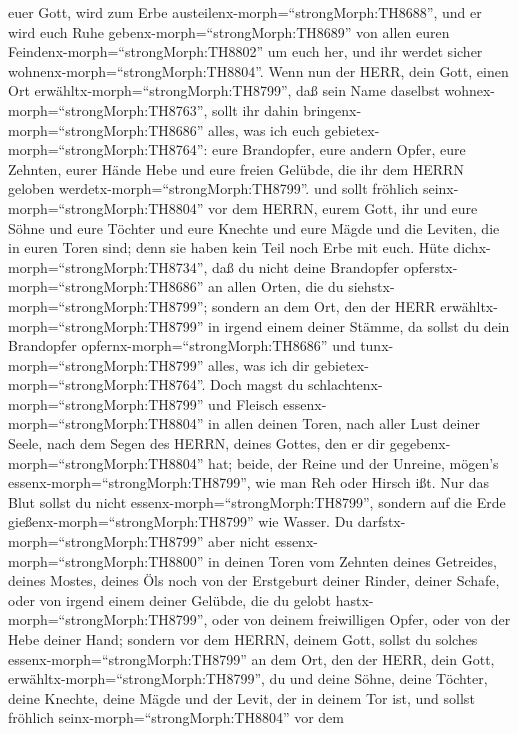 euer Gott, wird zum Erbe austeilenx-morph=``strongMorph:TH8688'', und er
wird euch Ruhe gebenx-morph=``strongMorph:TH8689'' von allen euren
Feindenx-morph=``strongMorph:TH8802'' um euch her, und ihr werdet sicher
wohnenx-morph=``strongMorph:TH8804''.  Wenn nun der HERR,
dein Gott, einen Ort erwähltx-morph=``strongMorph:TH8799'', daß sein
Name daselbst wohnex-morph=``strongMorph:TH8763'', sollt ihr dahin
bringenx-morph=``strongMorph:TH8686'' alles, was ich euch
gebietex-morph=``strongMorph:TH8764'': eure Brandopfer, eure andern
Opfer, eure Zehnten, eurer Hände Hebe und eure freien Gelübde, die ihr
dem HERRN geloben werdetx-morph=``strongMorph:TH8799''. 
und sollt fröhlich seinx-morph=``strongMorph:TH8804'' vor dem HERRN,
eurem Gott, ihr und eure Söhne und eure Töchter und eure Knechte und
eure Mägde und die Leviten, die in euren Toren sind; denn sie haben kein
Teil noch Erbe mit euch.  Hüte
dichx-morph=``strongMorph:TH8734'', daß du nicht deine Brandopfer
opferstx-morph=``strongMorph:TH8686'' an allen Orten, die du
siehstx-morph=``strongMorph:TH8799'';  sondern an dem Ort,
den der HERR erwähltx-morph=``strongMorph:TH8799'' in irgend einem
deiner Stämme, da sollst du dein Brandopfer
opfernx-morph=``strongMorph:TH8686'' und
tunx-morph=``strongMorph:TH8799'' alles, was ich dir
gebietex-morph=``strongMorph:TH8764''.  Doch magst du
schlachtenx-morph=``strongMorph:TH8799'' und Fleisch
essenx-morph=``strongMorph:TH8804'' in allen deinen Toren, nach aller
Lust deiner Seele, nach dem Segen des HERRN, deines Gottes, den er dir
gegebenx-morph=``strongMorph:TH8804'' hat; beide, der Reine und der
Unreine, mögen's essenx-morph=``strongMorph:TH8799'', wie man Reh oder
Hirsch ißt.  Nur das Blut sollst du nicht
essenx-morph=``strongMorph:TH8799'', sondern auf die Erde
gießenx-morph=``strongMorph:TH8799'' wie Wasser.  Du
darfstx-morph=``strongMorph:TH8799'' aber nicht
essenx-morph=``strongMorph:TH8800'' in deinen Toren vom Zehnten deines
Getreides, deines Mostes, deines Öls noch von der Erstgeburt deiner
Rinder, deiner Schafe, oder von irgend einem deiner Gelübde, die du
gelobt hastx-morph=``strongMorph:TH8799'', oder von deinem freiwilligen
Opfer, oder von der Hebe deiner Hand;  sondern vor dem
HERRN, deinem Gott, sollst du solches
essenx-morph=``strongMorph:TH8799'' an dem Ort, den der HERR, dein Gott,
erwähltx-morph=``strongMorph:TH8799'', du und deine Söhne, deine
Töchter, deine Knechte, deine Mägde und der Levit, der in deinem Tor
ist, und sollst fröhlich seinx-morph=``strongMorph:TH8804'' vor dem
